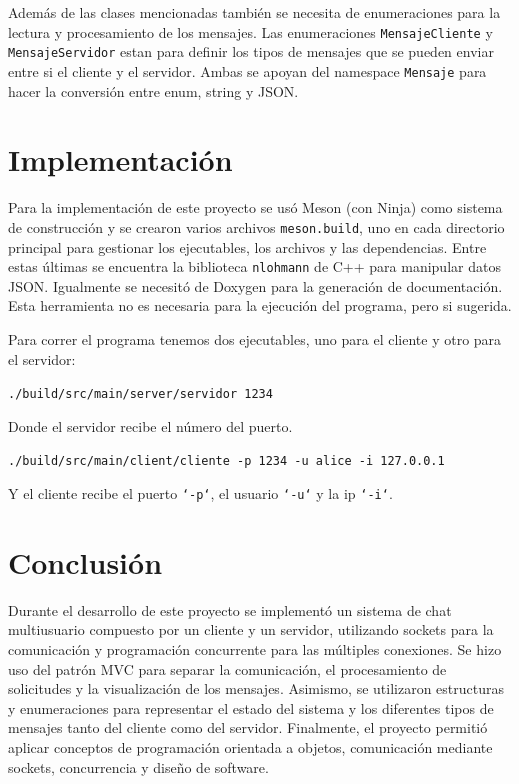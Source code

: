 \documentclass[12pt]{article}  %
\begin{document}
Además de las clases mencionadas también se necesita de enumeraciones para la
lectura y procesamiento de los mensajes. Las enumeraciones
\texttt{MensajeCliente} y \texttt{MensajeServidor} estan para definir los tipos
de mensajes que se pueden enviar entre si el cliente y el servidor. Ambas se
apoyan del namespace \texttt{Mensaje} para hacer la conversión entre enum,
string y JSON.

\section*{Implementación}

Para la implementación de este proyecto se usó Meson (con Ninja) como sistema de
construcción y se crearon varios archivos \texttt{meson.build}, uno en cada
directorio principal para gestionar los ejecutables, los archivos y las
dependencias. Entre estas últimas se encuentra la biblioteca \texttt{nlohmann}
de C++ para manipular datos JSON. Igualmente se necesitó de Doxygen para la
generación de documentación. Esta herramienta no es necesaria para la ejecución
del programa, pero si sugerida.

Para correr el programa tenemos dos ejecutables, uno para el cliente y otro para
el servidor:

\vspace{0.7em}
\centerline{\texttt{./build/src/main/server/servidor 1234}}
\vspace{0.7em}

Donde el servidor recibe el número del puerto.

\vspace{0.7em}
\centerline{\texttt{./build/src/main/client/cliente -p 1234 -u alice -i 127.0.0.1}}
\vspace{0.7em}

Y el cliente recibe el puerto \texttt{`-p`}, el usuario \texttt{`-u`} y la ip
\texttt{`-i`}.

\section*{Conclusión}

Durante el desarrollo de este proyecto se implementó un sistema de chat
multiusuario compuesto por un cliente y un servidor, utilizando sockets para la
comunicación y programación concurrente para las múltiples conexiones. Se hizo
uso del patrón MVC para separar la comunicación, el procesamiento de solicitudes
y la visualización de los mensajes. Asimismo, se utilizaron estructuras y
enumeraciones para representar el estado del sistema y los diferentes tipos de
mensajes tanto del cliente como del servidor. Finalmente, el proyecto permitió
aplicar conceptos de programación orientada a objetos, comunicación mediante
sockets, concurrencia y diseño de software.

\end{document}
